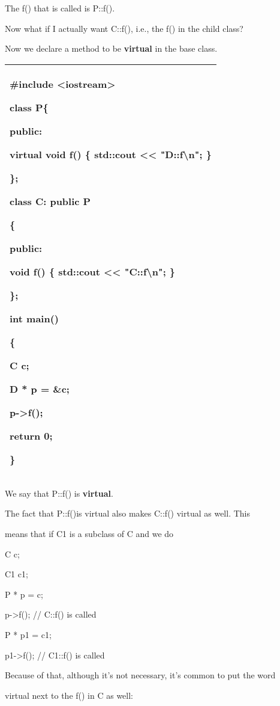 \documentclass[
]{article}
\begin{document}
The f() that is called is P::f().

Now what if I actually want C::f(), i.e., the f() in the child class?

Now we declare a method to be \textbf{virtual} in the base class.

\begin{longtable}[]{@{}l@{}}
\toprule
\endhead
\begin{minipage}[t]{0.97\columnwidth}\raggedright
\#include \textless iostream\textgreater{}

class P\{

public:

\textbf{virtual} void f() \{ std::cout \textless\textless{}
"D::f\textbackslash n"; \}

\};

class C: public P

\{

public:

void f() \{ std::cout \textless\textless{} "C::f\textbackslash n"; \}

\};

int main()

\{

C c;

D * p = \&c;

p-\textgreater f();

return 0;

\}\strut
\end{minipage}\tabularnewline
\bottomrule
\end{longtable}

We say that P::f() is \textbf{virtual}.

The fact that P::f()is virtual also makes C::f() virtual as well. This

means that if C1 is a subclass of C and we do

C c;

C1 c1;

P * p = c;

p-\textgreater f(); // C::f() is called

P * p1 = c1;

p1-\textgreater f(); // C1::f() is called

Because of that, although it's not necessary, it's common to put the
word

virtual next to the f() in C as well:
\end{document}
